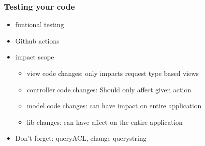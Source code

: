 \begin{frame}
  \frametitle{Testing your code}
  \begin{itemize}
    \item funtional testing
    \item Github actions
    \item impact scope
    \begin{itemize}
      \item view code changes: only impacts request type based views
      \item controller code changes: Should only affect given action
      \item model code changes: can have impact on entire application
      \item lib changes: can have affect on the entire application
    \end{itemize}
    \item Don't forget: queryACL, change querystring
  \end{itemize}
\end{frame}


